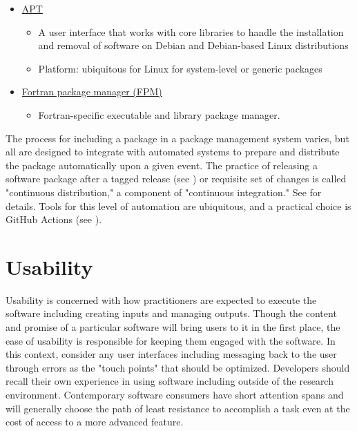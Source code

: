 \documentclass[]{nrel}
\begin{document}
\begin{itemize}
\item \href{https://en.wikipedia.org/wiki/APT\_(software)}{APT}
\begin{itemize}
\item A user interface that works with core libraries to handle the installation and removal of software on Debian and Debian-based Linux distributions
\item Platform: ubiquitous for Linux for system-level or generic packages
\end{itemize}

\item \href{https://fpm.fortran-lang.org/index.html}{Fortran package manager (FPM)}
\begin{itemize}
\item Fortran-specific executable and library package manager.
\end{itemize}

\end{itemize}

The process for including a package in a package management system varies, but all are designed
to integrate with automated systems to prepare and distribute the package automatically upon
a given event. The practice of releasing a software package after a tagged release
(see ) or requisite set of changes is called "continuous distribution,"
a component of "continuous integration." See  for details.
Tools for this level of automation are ubiquitous, and a practical choice
is GitHub Actions (see ).


\chapter{Usability}
\label{sec:usability}
Usability is concerned with how practitioners are expected to execute the software including
creating inputs and managing outputs.
Though the content and promise of a particular software will bring users to it in the first
place, the ease of usability is responsible for keeping them engaged with the software.
In this context, consider any user interfaces including messaging back to the user through
errors as the "touch points" that should be optimized.
Developers should recall their own experience in using software including outside
of the research environment.
Contemporary software consumers have short attention spans and will generally choose
the path of least resistance to accomplish a task even at the cost of access to a more
advanced feature.
\end{document}
